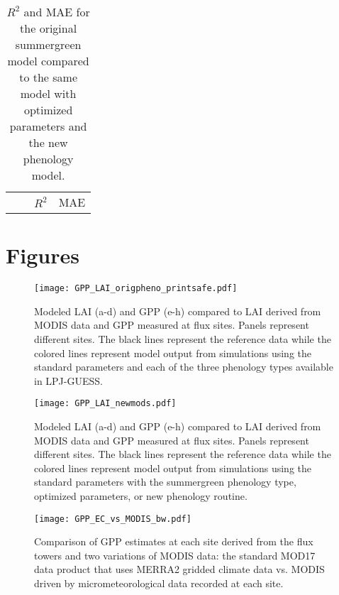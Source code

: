 \documentclass[]{article}
\begin{document}
\begin{table}[ht]
	\begin{threeparttable} %
		\caption{$R^2$ and MAE for the original summergreen model compared to the same model with optimized parameters and the new phenology model.} 
		\begin{tabular}{llrrrr}
			\toprule
			&& \multicolumn{2}{c}{$R^2$} & \multicolumn{2}{c}{MAE} \\
			\cmidrule(lr){3-4} \cmidrule(lr){5-6}
			
		\end{tabular}
	\end{threeparttable}
\end{table}

\section{Figures}

\begin{figure}[!htbp]
\begin{measuredfigure}
	\texttt{[image: GPP\_LAI\_origpheno\_printsafe.pdf]}
	\caption{Modeled LAI (a-d) and GPP (e-h) compared to LAI derived from MODIS data and GPP measured at flux sites. Panels represent different sites. The black lines represent the reference data while the colored lines represent model output from simulations using the standard parameters and each of the three phenology types available in LPJ-GUESS.}
	\label{fig:origpheno}
	\end{measuredfigure}
\end{figure}

\begin{figure}[!htbp]
	\begin{measuredfigure}
		\texttt{[image: GPP\_LAI\_newmods.pdf]}
		\caption{Modeled LAI (a-d) and GPP (e-h) compared to LAI derived from MODIS data and GPP measured at flux sites. Panels represent different sites. The black lines represent the reference data while the colored lines represent model output from simulations using the standard parameters with the summergreen phenology type, optimized parameters, or new phenology routine.}
		\label{fig:newphen}
	\end{measuredfigure}
\end{figure}

\begin{figure}[!htbp]
	\begin{measuredfigure}
		\texttt{[image: GPP\_EC\_vs\_MODIS\_bw.pdf]}
		\caption{Comparison of GPP estimates at each site derived from the flux towers and two variations of MODIS data: the standard MOD17 data product that uses MERRA2 gridded climate data vs. MODIS driven by micrometeorological data recorded at each site.}
		\label{fig:modis}
	\end{measuredfigure}
\end{figure}
\end{document}
